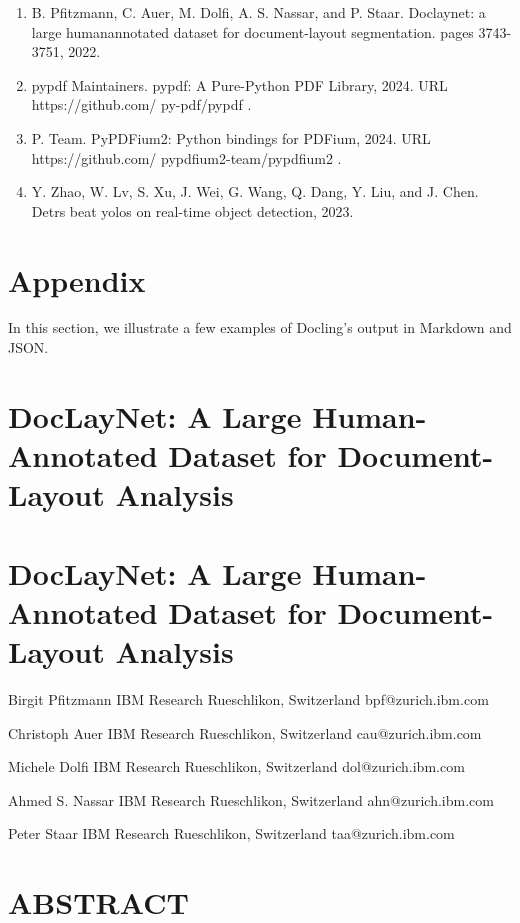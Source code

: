 \documentclass[11pt,a4paper]{article}
\begin{document}
\begin{enumerate}
\item B. Pfitzmann, C. Auer, M. Dolfi, A. S. Nassar, and P. Staar. Doclaynet: a large humanannotated dataset for document-layout segmentation. pages 3743-3751, 2022.
\item pypdf Maintainers. pypdf: A Pure-Python PDF Library, 2024. URL https://github.com/ py-pdf/pypdf .
\item P. Team. PyPDFium2: Python bindings for PDFium, 2024. URL https://github.com/ pypdfium2-team/pypdfium2 .
\item Y. Zhao, W. Lv, S. Xu, J. Wei, G. Wang, Q. Dang, Y. Liu, and J. Chen. Detrs beat yolos on real-time object detection, 2023.
\end{enumerate}

\section{Appendix}

In this section, we illustrate a few examples of Docling's output in Markdown and JSON.

\section{DocLayNet: A Large Human-Annotated Dataset for Document-Layout Analysis}

\section{DocLayNet: A Large Human-Annotated Dataset for Document-Layout Analysis}

Birgit Pfitzmann IBM Research Rueschlikon, Switzerland bpf@zurich.ibm.com

Christoph Auer IBM Research Rueschlikon, Switzerland cau@zurich.ibm.com

Michele Dolfi IBM Research Rueschlikon, Switzerland dol@zurich.ibm.com

Ahmed S. Nassar IBM Research Rueschlikon, Switzerland ahn@zurich.ibm.com

Peter Staar IBM Research Rueschlikon, Switzerland taa@zurich.ibm.com

\section{ABSTRACT}
\end{document}
